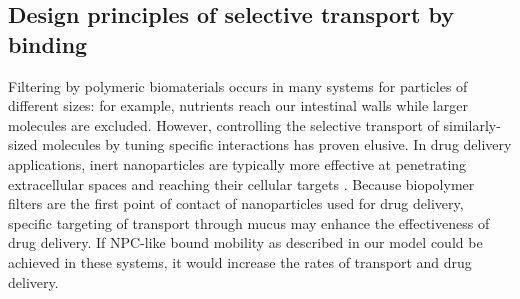 \subsection*{Design principles of selective transport by binding}

Filtering by polymeric biomaterials occurs in many systems for
particles of different sizes: for example, nutrients reach our
intestinal walls while larger molecules are excluded.  However,
controlling the selective transport of similarly-sized molecules by
tuning specific interactions has proven elusive. In drug delivery
applications, inert nanoparticles are typically more effective at penetrating
extracellular spaces and reaching their cellular targets
\cite{witten17}. Because biopolymer filters are the first point of
contact of nanoparticles used for drug delivery, specific targeting of
transport through mucus may enhance the effectiveness of drug
delivery. If NPC-like bound mobility as described in our model could
be achieved in these systems, it would increase the rates of
transport and drug delivery. 

